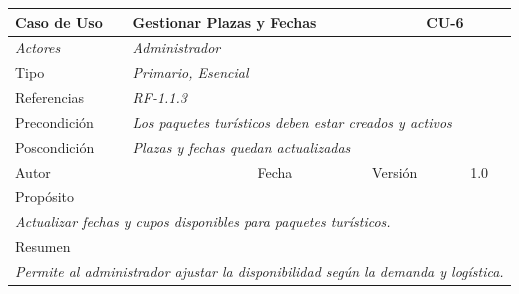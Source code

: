 \begin{table}[H]
\begin{tabular}{|llllllll|}
\hline
\multicolumn{1}{|l|}{\cellcolor[HTML]{F2F2F2}Caso de Uso} & \multicolumn{5}{l|}{Gestionar Plazas y Fechas} & \multicolumn{2}{l|}{\cellcolor[HTML]{E6E6E6}CU-6} \\ \hline
\multicolumn{1}{|l|}{{\color[HTML]{808080} \textit{Actores}}} & \multicolumn{7}{l|}{{\color[HTML]{808080} \textit{Administrador}}} \\ \hline
\multicolumn{1}{|l|}{Tipo} & \multicolumn{7}{l|}{{\color[HTML]{808080} \textit{Primario, Esencial}}} \\ \hline
\multicolumn{1}{|l|}{Referencias} & \multicolumn{2}{l|}{{\color[HTML]{808080} \textit{RF-1.1.3}}} & \multicolumn{5}{l|}{} \\ \hline
\multicolumn{1}{|l|}{Precondición} & \multicolumn{7}{l|}{{\color[HTML]{808080} \textit{Los paquetes turísticos deben estar creados y activos}}} \\ \hline
\multicolumn{1}{|l|}{Poscondición} & \multicolumn{7}{l|}{{\color[HTML]{808080} \textit{Plazas y fechas quedan actualizadas}}} \\ \hline
\multicolumn{1}{|l|}{Autor} & \multicolumn{1}{l|}{} & \multicolumn{2}{l|}{Fecha} & \multicolumn{1}{l|}{} & \multicolumn{2}{l|}{Versión} & 1.0 \\ \hline
\multicolumn{8}{|l|}{Propósito} \\ \hline
\multicolumn{8}{|p{15cm}|}{{\color[HTML]{808080} \textit{Actualizar fechas y cupos disponibles para paquetes turísticos.}}} \\ \hline
\multicolumn{8}{|l|}{Resumen} \\ \hline
\multicolumn{8}{|p{15cm}|}{{\color[HTML]{808080} \textit{Permite al administrador ajustar la disponibilidad según la demanda y logística.}}} \\ \hline
\end{tabular}
\end{table}

